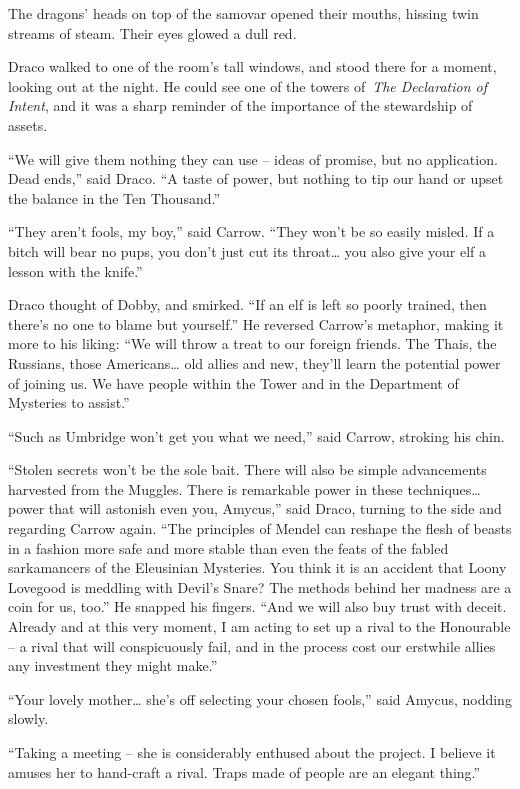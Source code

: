 The dragons' heads on top of the samovar opened their mouths, hissing
twin streams of steam. Their eyes glowed a dull red.

Draco walked to one of the room's tall windows, and stood there for a
moment, looking out at the night. He could see one of the towers
of~\emph{The Declaration of Intent}, and it was a sharp reminder of the
importance of the stewardship of assets.

``We will give them nothing they can use -- ideas of promise, but no
application. Dead ends,'' said Draco. ``A taste of power, but nothing to
tip our hand or upset the balance in the Ten Thousand.''

``They aren't fools, my boy,'' said Carrow. ``They won't be so easily
misled. If a bitch will bear no pups, you don't just cut its
throat\ldots{} you also give your elf a lesson with the knife.''

Draco thought of Dobby, and smirked. ``If an elf is left so poorly
trained, then there's no one to blame but yourself.'' He reversed
Carrow's metaphor, making it more to his liking: ``We will throw a treat
to our foreign friends. The Thais, the Russians, those Americans\ldots{}
old allies and new, they'll learn the potential power of joining us. We
have people within the Tower and in the Department of Mysteries to
assist.''

``Such as Umbridge won't get you what we need,'' said Carrow, stroking
his chin.

``Stolen secrets won't be the sole bait. There will also be simple
advancements harvested from the Muggles. There is remarkable power in
these techniques\ldots{} power that will astonish even you, Amycus,''
said Draco, turning to the side and regarding Carrow again. ``The
principles of Mendel can reshape the flesh of beasts in a fashion more
safe and more stable than even the feats of the fabled sarkamancers of
the Eleusinian Mysteries. You think it is an accident that Loony
Lovegood is meddling with Devil's Snare? The methods behind her madness
are a coin for us, too.'' He snapped his fingers. ``And we will also buy
trust with deceit. Already and at this very moment, I am acting to set
up a rival to the Honourable -- a rival that will conspicuously fail,
and in the process cost our erstwhile allies any investment they might
make.''

``Your lovely mother\ldots{} she's off selecting your chosen fools,''
said Amycus, nodding slowly.

``Taking a meeting -- she is considerably enthused about the project. I
believe it amuses her to hand-craft a rival. Traps made of people are an
elegant thing.''

